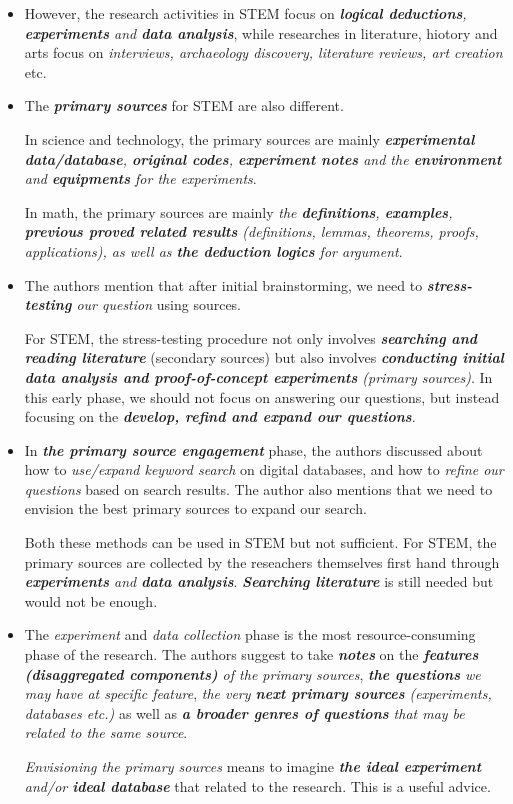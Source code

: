 \documentclass[11pt]{article}
\begin{document}
\begin{itemize}
\begin{itemize}
\item However, the research activities in STEM focus on \emph{\textbf{logical deductions}, \textbf{experiments} and \textbf{data analysis}}, while researches in literature, hiotory and arts focus on \emph{interviews, archaeology discovery, literature reviews, art creation} etc.  

\item The \emph{\textbf{primary sources}} for STEM are also different. 

In science and technology, the primary sources are mainly \emph{\textbf{experimental data/database}, \textbf{original codes}, \textbf{experiment notes} and the \textbf{environment} and \textbf{equipments} for the experiments}.  

In math, the primary sources are mainly \emph{the \textbf{definitions}, \textbf{examples}, \textbf{previous proved related results} (definitions, lemmas, theorems, proofs, applications), as well as \textbf{the deduction logics} for argument}. 

\item The authors mention that after initial brainstorming, we need to \emph{\textbf{stress-testing} our question} using sources. 

For STEM, the stress-testing procedure not only involves \emph{\textbf{searching and reading literature}} (secondary sources) but also involves \emph{\textbf{conducting initial data analysis and proof-of-concept experiments} (primary sources)}. In this early phase, we should not focus on answering our questions, but instead focusing on the \emph{\textbf{develop, refind and expand our questions}}.  

\item In \emph{\textbf{the primary source engagement}} phase, the authors discussed about how to \emph{use/expand keyword search} on digital databases, and how to \emph{refine our questions} based on search results.  The author also mentions that we need to envision the best primary sources to expand our search. 

Both these methods can be used in STEM but not sufficient. For STEM, the primary sources are collected by the reseachers themselves first hand through \emph{\textbf{experiments} and \textbf{data analysis}}. \emph{\textbf{Searching literature}} is still needed but would not be enough. 

\item The \emph{experiment} and \emph{data collection} phase is the most resource-consuming phase of the research. The authors suggest to take \emph{\textbf{notes}} on the \emph{\textbf{features (disaggregated components)} of the primary sources}, \emph{\textbf{the questions} we may have at specific feature}, \emph{the very \textbf{next primary sources} (experiments, databases etc.)} as well as \emph{\textbf{a broader genres of questions} that may be related to the same source}. 

\emph{Envisioning the primary sources} means to imagine \emph{\textbf{the ideal experiment} and/or \textbf{ideal database}} that related to the research. This is a useful advice. 
\end{itemize}
\end{itemize}
\end{document}
